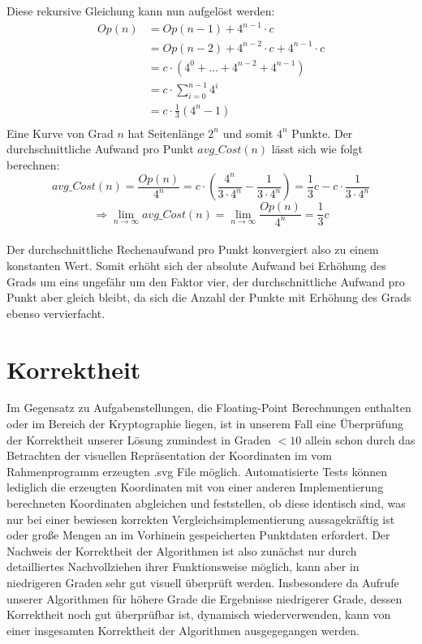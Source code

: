 \documentclass[course=erap]{aspdoc}
\begin{document}
Diese rekursive Gleichung kann nun aufgelöst werden: 
\begin{align*}
  Op(n) &= Op(n-1) + 4^{n-1}\cdot c\\
    &= Op(n-2) + 4^{n-2}\cdot c + 4^{n-1}\cdot c \\
    &= c\cdot(4^{0} + ... + 4^{n-2} + 4^{n-1}) \\
    &= c\cdot\sum_{i=0}^{n-1} 4^{i}\\
    &= c\cdot\frac{1}{3}(4^n-1)\\
\end{align*}
Eine Kurve von Grad $n$ hat Seitenlänge $2^n$ und somit $4^n$ Punkte. Der durchschnittliche Aufwand pro Punkt $avg\_Cost(n)$ lässt sich wie folgt berechnen: \ \\
\[avg\_Cost(n) = \frac{Op(n)}{4^n} = c \cdot \left(\frac{4^n}{3 \cdot 4^n} - \frac{1}{3 \cdot 4^n}\right) = \frac{1}{3}c - c \cdot \frac{1}{3 \cdot 4^n}\] 
\[\Rightarrow \lim_{n\to\infty} avg\_Cost(n) = \lim_{n\to\infty} \frac{Op(n)}{4^n} = \frac{1}{3}c\]  \ \\ 
Der durchschnittliche Rechenaufwand pro Punkt konvergiert also zu einem konstanten Wert. Somit erhöht sich der absolute Aufwand bei Erhöhung des Grads um eins ungefähr um den Faktor vier, der durchschnittliche Aufwand pro Punkt aber gleich bleibt, da sich die Anzahl der Punkte mit Erhöhung des Grads ebenso vervierfacht.

\section{Korrektheit}
Im Gegensatz zu Aufgabenstellungen, die Floating-Point Berechnungen enthalten oder im Bereich der Kryptographie liegen, ist in unserem Fall eine Überprüfung der Korrektheit unserer Lösung zumindest in Graden $<10$ allein schon durch das Betrachten der visuellen Repräsentation der Koordinaten im vom Rahmenprogramm erzeugten .svg File möglich. Automatisierte Tests können lediglich die erzeugten Koordinaten mit von einer anderen Implementierung berechneten Koordinaten abgleichen und feststellen, ob diese identisch sind, was nur bei einer bewiesen korrekten Vergleichsimplementierung aussagekräftig ist oder große Mengen an im Vorhinein gespeicherten Punktdaten erfordert.
Der Nachweis der Korrektheit der Algorithmen ist also zunächst nur durch detailliertes Nachvollziehen ihrer Funktionsweise möglich, kann aber in niedrigeren Graden sehr gut visuell überprüft werden. Insbesondere da Aufrufe unserer Algorithmen für höhere Grade die Ergebnisse niedrigerer Grade, dessen Korrektheit noch gut überprüfbar ist, dynamisch wiederverwenden, kann von einer insgesamten Korrektheit der Algorithmen ausgegegangen werden.
\end{document}
